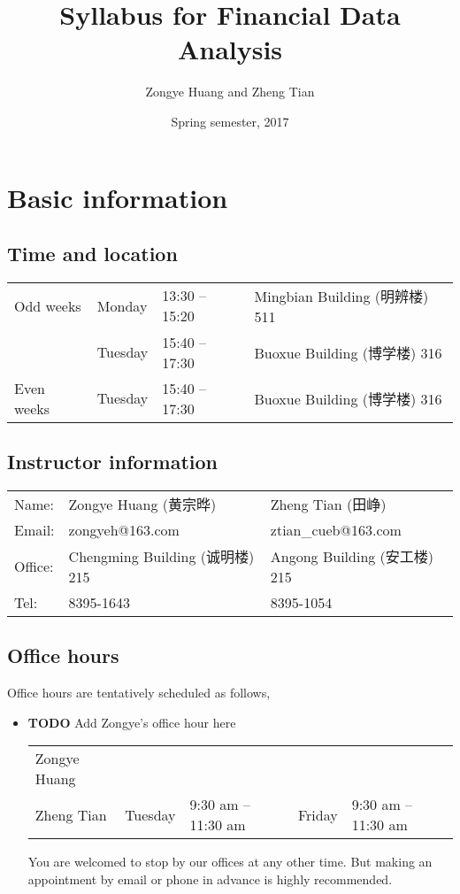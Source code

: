 \documentclass[11pt]{article}
\author{Zongye Huang and Zheng Tian}
\date{Spring semester, 2017}
\title{Syllabus for Financial Data Analysis}
\begin{document}
\maketitle

\section{Basic information}
\label{sec:org300e6ef}

\subsection*{Time and location}
\label{sec:orgbd3325a}

\begin{center}
\begin{tabular}{llll}
Odd weeks & Monday & 13:30 -- 15:20 & Mingbian Building (明辨楼) 511\\
 & Tuesday & 15:40 -- 17:30 & Buoxue Building (博学楼) 316\\
Even weeks & Tuesday & 15:40 -- 17:30 & Buoxue Building (博学楼) 316\\
\end{tabular}
\end{center}


\subsection*{Instructor information}
\label{sec:org3fa5bcb}

\begin{center}
\begin{tabular}{lll}
Name: & Zongye Huang (黄宗晔) & Zheng Tian (田峥)\\
Email: & zongyeh@163.com & ztian\_cueb@163.com\\
Office: & Chengming Building (诚明楼) 215 & Angong Building (安工楼) 215\\
Tel: & 8395-1643 & 8395-1054\\
\end{tabular}
\end{center}


\subsection*{Office hours}
\label{sec:org238d4b7}
Office hours are tentatively scheduled as follows,

\begin{itemize}
\item {\bfseries\sffamily TODO} Add Zongye's office hour here
\label{sec:org0866250}
\begin{center}
\begin{tabular}{lllll}
Zongye Huang &  &  &  & \\
Zheng Tian & Tuesday & 9:30 am -- 11:30 am & Friday & 9:30 am -- 11:30 am\\
\end{tabular}
\end{center}

You are welcomed to stop by our offices at any other time. But making
an appointment by email or phone in advance is highly recommended.
\end{itemize}
\end{document}
